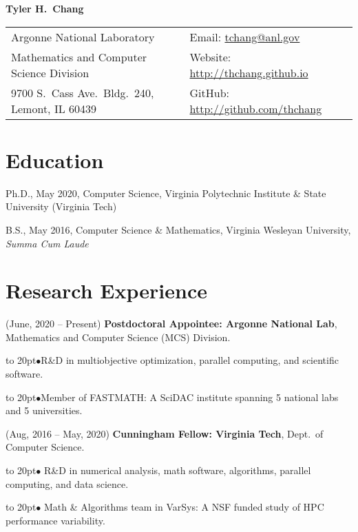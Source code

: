 \documentclass[11pt]{article}
\def\bullitem{\par\hangindent=15pt \hangafter=1
\noindent\hbox to 20pt{\hfil$\bullet$\hfil}\ignorespaces}
\begin{document}
{\large \textbf{Tyler H.\ Chang}}

\begin{tabular}{ll}
   Argonne National Laboratory
      & Email: \href{mailto:tchang@anl.gov}{tchang@anl.gov}\\
   Mathematics and Computer Science Division
      & Website: \url{http://thchang.github.io}\\
   9700 S.\ Cass Ave.\ Bldg.\ 240, Lemont, IL 60439
      & GitHub: \url{http://github.com/thchang} \\
\end{tabular}

%

\section*{Education}

Ph.D., May 2020, Computer Science,
Virginia Polytechnic Institute \& State University
(Virginia Tech)

\medskip

B.S., May 2016, Computer Science \& Mathematics,
Virginia Wesleyan University, \textit{Summa Cum Laude}

\section*{Research Experience}

\hangindent=0.3in
(June, 2020 -- Present)
\textbf{Postdoctoral Appointee: Argonne National Lab},
Mathematics and Computer Science (MCS) Division.
\bullitem R\&D in multiobjective optimization, parallel computing, and
scientific software.
\bullitem Member of FASTMATH: A SciDAC institute spanning
5 national labs and 5 universities.

\medskip

\hangindent=0.3in
(Aug, 2016 -- May, 2020)
\textbf{Cunningham Fellow: Virginia Tech},
Dept.\ of Computer Science.
\bullitem
R\&D in numerical analysis, math software,
algorithms, parallel computing, and data science.
\bullitem
Math \& Algorithms team in VarSys: A NSF funded study of
HPC performance variability.

\medskip
\end{document}
